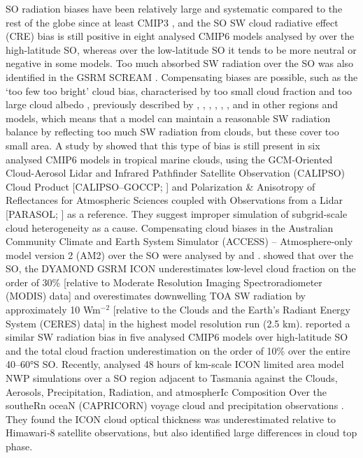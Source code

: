 \documentclass[12pt,a4paper]{article}
\begin{document}
SO radiation biases have been relatively large and systematic compared to the
rest of the globe since at least CMIP3 \citep{trenberth2010}, and the SO SW
cloud radiative effect (CRE) bias is still positive in eight analysed CMIP6
models analysed by \cite{schuddeboom2021} over the high-latitude SO, whereas
over the low-latitude SO it tends to be more neutral or negative in some
models. Too much absorbed SW radiation over the SO was also identified in the
GSRM SCREAM \cite{caldwell2021}. Compensating biases are possible, such as the
`too few too bright' cloud bias, characterised by too small cloud fraction and
too large cloud albedo \citep{wall2017,kuma2020}, previously described by
\cite{webb2001}, \cite{weare2004}, \cite{zhang2005}, \cite{karlsson2008},
\cite{nam2012}, \cite{klein2013}, and \cite{bender2017} in other regions and
models, which means that a model can maintain a reasonable SW radiation balance by
reflecting too much SW radiation from clouds, but these cover too small area.
A study by \cite{konsta2022} showed that this type of bias is still
present in six analysed CMIP6 models in tropical marine clouds, using the
GCM-Oriented Cloud-Aerosol Lidar and Infrared Pathfinder Satellite Observation
(CALIPSO) Cloud Product [CALIPSO--GOCCP; \cite{chepfer2010}] and Polarization
\& Anisotropy of Reflectances for Atmospheric Sciences coupled with
Observations from a Lidar [PARASOL; \cite{lier2008}] as a reference. They
suggest improper simulation of subgrid-scale cloud heterogeneity as a cause.
Compensating cloud biases in the Australian Community Climate and Earth System
Simulator (ACCESS) – Atmosphere-only model version 2 (AM2) over the SO were
analysed by \cite{fiddes2022} and \cite{fiddes2024}.  \cite{possner2022} showed
that over the SO, the DYAMOND GSRM ICON underestimates low-level cloud fraction
on the order of 30\% [relative to Moderate Resolution Imaging Spectroradiometer
(MODIS) data] and overestimates downwelling TOA SW radiation by
approximately 10 Wm$^\mathrm{-2}$ [relative to the Clouds and the Earth’s
Radiant Energy System (CERES) data] in the highest model resolution run (2.5
km).  \cite{zhao2022} reported a similar SW radiation bias in five analysed
CMIP6 models over high-latitude SO and the total cloud fraction underestimation
on the order of 10\% over the entire 40--60°S SO. Recently, \cite{ramadoss2024}
analysed 48 hours of km-scale ICON limited area model NWP simulations over a SO
region adjacent to Tasmania against the Clouds, Aerosols, Precipitation,
Radiation, and atmospherIc Composition Over the southeRn oceaN (CAPRICORN)
voyage cloud and precipitation observations \cite{mcfarquhar2021}. They found
the ICON cloud optical thickness was underestimated relative to Himawari‐8
satellite observations, but also identified large differences in cloud top
phase.
\end{document}
